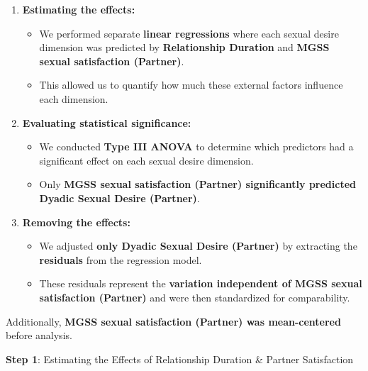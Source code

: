 \documentclass[
  bookmarksnumbered]{article}
\providecommand{\tightlist}{%
  \setlength{\itemsep}{0pt}\setlength{\parskip}{0pt}}
\begin{document}
\begin{enumerate}
\def\labelenumi{\arabic{enumi}.}
\tightlist
\item
  \textbf{Estimating the effects:}

  \begin{itemize}
  \tightlist
  \item
    We performed separate \textbf{linear regressions} where each sexual desire dimension was predicted by \textbf{Relationship Duration} and \textbf{MGSS sexual satisfaction (Partner)}.
  \item
    This allowed us to quantify how much these external factors influence each dimension.
  \end{itemize}
\item
  \textbf{Evaluating statistical significance:}

  \begin{itemize}
  \tightlist
  \item
    We conducted \textbf{Type III ANOVA} to determine which predictors had a significant effect on each sexual desire dimension.
  \item
    Only \textbf{MGSS sexual satisfaction (Partner) significantly predicted Dyadic Sexual Desire (Partner)}.
  \end{itemize}
\item
  \textbf{Removing the effects:}

  \begin{itemize}
  \tightlist
  \item
    We adjusted \textbf{only Dyadic Sexual Desire (Partner)} by extracting the \textbf{residuals} from the regression model.
  \item
    These residuals represent the \textbf{variation independent of MGSS sexual satisfaction (Partner)} and were then standardized for comparability.
  \end{itemize}
\end{enumerate}

Additionally, \textbf{MGSS sexual satisfaction (Partner) was mean-centered} before analysis.

\textbf{Step 1}: Estimating the Effects of Relationship Duration \& Partner Satisfaction
\end{document}
